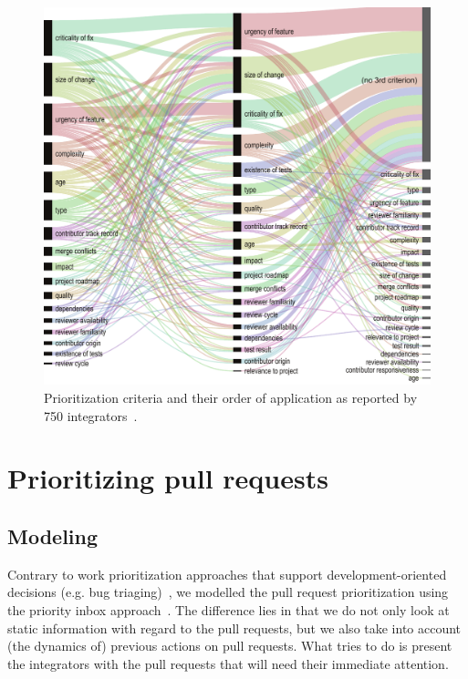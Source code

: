 \documentclass[conference]{IEEEtran}
\begin{document}
\begin{figure}[t]
  \begin{center}
    \includegraphics[scale=0.44]{../figs/prioritization-criteria}
  \end{center}
  \vspace{-3mm}
  \caption{Prioritization criteria and their order of application as reported by
  750 integrators~\cite{GZSD15}.}
  \label{fig:prioritization}
  \vspace{-6mm}
\end{figure}


\section{Prioritizing pull requests}

\subsection{Modeling} 
Contrary to work prioritization approaches that support development-oriented 
decisions (e.g. bug triaging)~\cite{AnvikTSE2011,Jeong:2009:IBT:1595696.1595715,Tamrawi:2011:FSC:2025113.2025163}, we modelled the pull 
request prioritization using the priority inbox approach~\cite{Conway2011}. The
difference lies in that we do not only look at static information with regard to the 
pull requests, but we also take into account (the dynamics of) previous actions on pull requests. 
What \prioritizer tries to do is present the integrators with the pull requests 
that will need their immediate attention.
\end{document}
